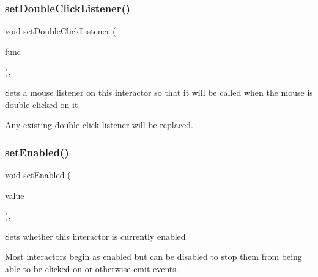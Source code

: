 \subsubsection{\texorpdfstring{set\+Double\+Click\+Listener()}{setDoubleClickListener()}\hspace{0.1cm}{\footnotesize\ttfamily [2/2]}}
{\footnotesize\ttfamily void set\+Double\+Click\+Listener (\begin{DoxyParamCaption}\item[{\mbox{\hyperlink{namespacesgl_a54427ce97bb1c2804e4fe2b0a62e8b17}{G\+Event\+Listener\+Void}}}]{func }\end{DoxyParamCaption})\hspace{0.3cm}{\ttfamily [virtual]}, {\ttfamily [inherited]}}



Sets a mouse listener on this interactor so that it will be called when the mouse is double-\/clicked on it. 

Any existing double-\/click listener will be replaced. \mbox{\label{classsgl_1_1GInteractor_ab831367dd84bbd579e02e55bacb21343}} 
\subsubsection{\texorpdfstring{set\+Enabled()}{setEnabled()}}
{\footnotesize\ttfamily void set\+Enabled (\begin{DoxyParamCaption}\item[{bool}]{value }\end{DoxyParamCaption})\hspace{0.3cm}{\ttfamily [virtual]}, {\ttfamily [inherited]}}



Sets whether this interactor is currently enabled. 

Most interactors begin as enabled but can be disabled to stop them from being able to be clicked on or otherwise emit events. \mbox{\label{classsgl_1_1GObservable_ad2f6d34961c50f6c1e0659990b79f741}} 
